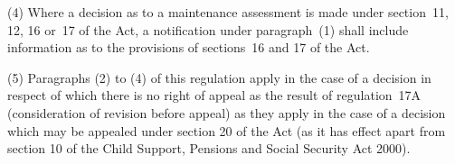 \documentclass[a4paper,12pt]{article}
\begin{document}
%

(4) Where a decision as to a maintenance assessment is made under section~11, 12, 16 or~17 of the Act, a notification under paragraph~(1) shall include information as to the provisions of sections~16 and 17 of the Act.

(5) Paragraphs (2) to (4) of this regulation apply in the case of a decision in respect of which there is no right of appeal as the result of regulation~17A (consideration of revision before appeal) as they apply in the case of a decision which may be appealed under section 20 of the Act (as it has effect apart from section 10 of the Child Support, Pensions and Social Security Act 2000).
\end{document}
